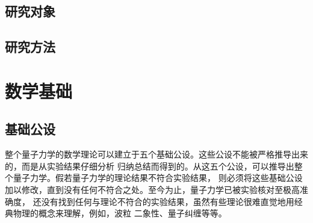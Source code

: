 \documentclass[type=doctor]{fduthesis-2026}
\begin{document}
\section{研究对象}

\section{研究方法}

\chapter{数学基础}

\section{基础公设}

整个量子力学的数学理论可以建立于五个基础公设。这些公设不能被严格推导出来的，而是从实验结果仔细分析
归纳总结而得到的。从这五个公设，可以推导出整个量子力学。假若量子力学的理论结果不符合实验结果，
则必须将这些基础公设加以修改，直到没有任何不符合之处。至今为止，量子力学已被实验核对至极高准确度，
还没有找到任何与理论不符合的实验结果，虽然有些理论很难直觉地用经典物理的概念来理解，例如，波粒
二象性、量子纠缠等等\cite{zurek2014quantum,cohen2013claude,zettili2003quantum}。
\end{document}

